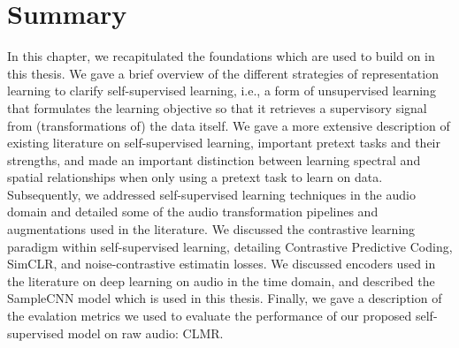 \section*{Summary}
In this chapter, we recapitulated the foundations which are used to build on in this thesis. We gave a brief overview of the different strategies of representation learning to clarify self-supervised learning, i.e., a form of unsupervised learning that formulates the learning objective so that it retrieves a supervisory signal from (transformations of) the data itself. We gave a more extensive description of existing literature on self-supervised learning, important pretext tasks and their strengths, and made an important distinction between learning spectral and spatial relationships when only using a pretext task to learn on data. Subsequently, we addressed self-supervised learning techniques in the audio domain and detailed some of the audio transformation pipelines and augmentations used in the literature. We discussed the contrastive learning paradigm within self-supervised learning, detailing Contrastive Predictive Coding, SimCLR, and noise-contrastive estimatin losses. We discussed encoders used in the literature on deep learning on audio in the time domain, and described the SampleCNN model which is used in this thesis. Finally, we gave a description of the evalation metrics we used to evaluate the performance of our proposed self-supervised model on raw audio: CLMR.